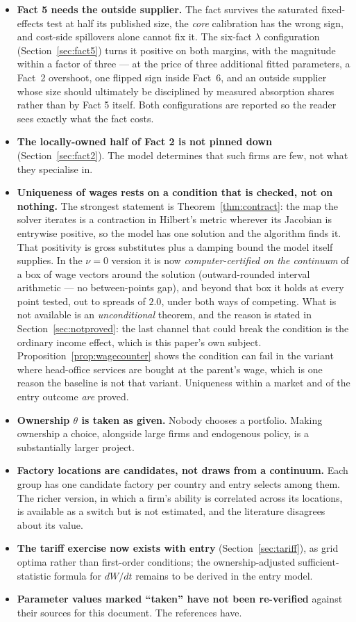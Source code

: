 \documentclass[11pt]{article}
\theoremstyle{plain}
\theoremstyle{remark}
\theoremstyle{definition}
\begin{document}
\begin{itemize}
\item \textbf{Fact 5 needs the outside supplier.} The fact survives the saturated
fixed-effects test at half its published size, the \emph{core} calibration has the
wrong sign, and cost-side spillovers alone cannot fix it. The six-fact $\lambda$
configuration (Section~\ref{sec:fact5}) turns it positive on both margins, with the
magnitude within a factor of three --- at the price of three additional fitted
parameters, a Fact~2 overshoot, one flipped sign inside Fact~6, and an outside
supplier whose size should ultimately be disciplined by measured absorption shares
rather than by Fact 5 itself. Both configurations are reported so the reader sees
exactly what the fact costs.
\item \textbf{The locally-owned half of Fact 2 is not pinned down}
(Section~\ref{sec:fact2}). The model determines that such firms are few, not what they
specialise in.
\item \textbf{Uniqueness of wages rests on a condition that is checked, not on nothing.} The strongest statement is Theorem~\ref{thm:contract}: the map the solver iterates is a contraction in Hilbert's metric wherever its Jacobian is entrywise positive, so the model has one solution and the algorithm finds it. That positivity is gross substitutes plus a damping bound the model itself supplies. In the $\nu=0$ version it is now \emph{computer-certified on the continuum} of a box of wage vectors around the solution (outward-rounded interval arithmetic --- no between-points gap), and beyond that box it holds at every point tested, out to spreads of $2.0$, under both ways of competing. What is not available is an \emph{unconditional} theorem, and the reason is stated in Section~\ref{sec:notproved}: the last channel that could break the condition is the ordinary income effect, which is this paper's own subject. Proposition~\ref{prop:wagecounter} shows the condition can fail in the variant where head-office services are bought at the parent's wage, which is one reason the baseline is not that variant.
Uniqueness within a market and of the entry outcome \emph{are} proved.
\item \textbf{Ownership $\theta$ is taken as given.} Nobody chooses a portfolio. Making
ownership a choice, alongside large firms and endogenous policy, is a substantially
larger project.
\item \textbf{Factory locations are candidates, not draws from a continuum.} Each group
has one candidate factory per country and entry selects among them. The richer version,
in which a firm's ability is correlated across its locations, is available as a switch
but is not estimated, and the literature disagrees about its value.
\item \textbf{The tariff exercise now exists with entry} (Section~\ref{sec:tariff}),
as grid optima rather than first-order conditions; the ownership-adjusted
sufficient-statistic formula for $dW/dt$ remains to be derived in the entry model.
\item \textbf{Parameter values marked ``taken'' have not been re-verified} against their
sources for this document. The references have.
\end{itemize}
\end{document}
